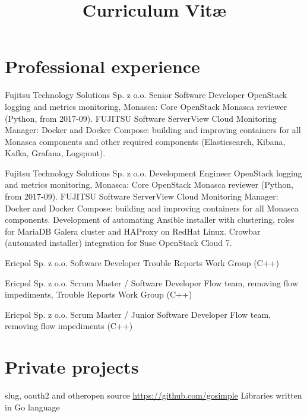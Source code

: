 \documentclass[11pt,a4paper,sans,english]{moderncv}   %
\title{Curriculum Vit\ae{}}
\begin{document}
\makecvtitle

\vspace{-1.6cm}

\section{Professional experience}

	{Fujitsu Technology Solutions Sp. z o.o.}{}{}
	{Senior Software Developer}
	{OpenStack logging and metrics monitoring, Monasca:
	Core OpenStack Monasca reviewer (Python, from 2017-09).
	FUJITSU Software ServerView Cloud Monitoring Manager:
	Docker and Docker Compose: building and improving containers for all Monasca components
	and other required components (Elasticsearch, Kibana, Kafka, Grafana, Logspout).
	}

	{Fujitsu Technology Solutions Sp. z o.o.}{}{}
	{Development Engineer}
	{OpenStack logging and metrics monitoring, Monasca:
	Core OpenStack Monasca reviewer (Python, from 2017-09).
	FUJITSU Software ServerView Cloud Monitoring Manager:
	Docker and Docker Compose: building and improving containers for all Monasca components.
	Development of automating Ansible installer with clustering, roles for MariaDB Galera cluster
	and HAProxy on RedHat Linux. Crowbar (automated installer) integration for Suse OpenStack
	Cloud 7.
	}

	{Ericpol Sp. z o.o.}{}{}
	{Software Developer}
	{Trouble Reports Work Group (C++)}

	{Ericpol Sp. z o.o.}{}{}
	{Scrum Master / Software Developer}
	{Flow team, removing flow impediments, Trouble Reports Work Group (C++)}

	{Ericpol Sp. z o.o.}{}{}
	{Scrum Master / Junior Software Developer}
	{Flow team, removing flow impediments (C++)}


\vspace{-0.3cm}

\section{Private projects}

	{slug, oauth2 and other}{open source}{}
	{\url{https://github.com/gosimple}}
	{Libraries written in Go language}
\end{document}
